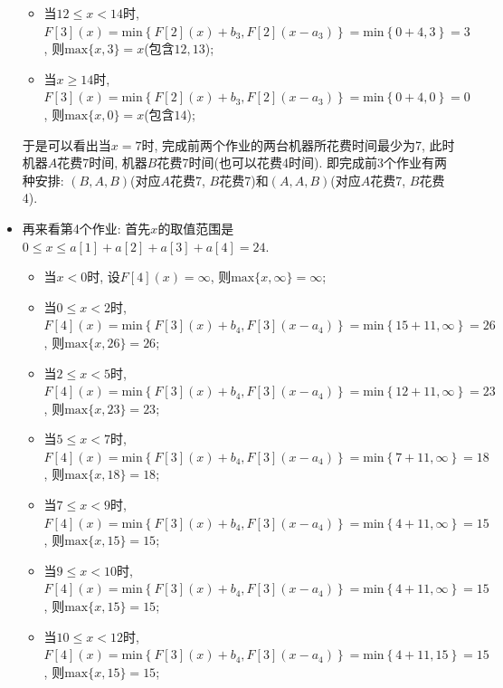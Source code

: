 \documentclass{article}
\begin{document}
\begin{homeworkProblem}
\begin{itemize}
\begin{itemize}
			\item 当$12\leq x <14$时, $F\left[ 3 \right] \left( x \right) =\text{min} \left\{ F\left[ 2 \right] \left( x \right) +b_3,F\left[ 2 \right] \left( x-a_3 \right) \right\} =\text{min} \left\{ 0+4,3 \right\} =3$, 则$\text{max}\{x,3\}=x$(包含$12,13$);
			\item 当$x\geq 14$时, $F\left[ 3 \right] \left( x \right) =\text{min} \left\{ F\left[ 2 \right] \left( x \right) +b_3,F\left[ 2 \right] \left( x-a_3 \right) \right\} =\text{min} \left\{ 0+4,0 \right\} =0$, 则$\text{max}\{x,0\}=x$(包含$14$);
		\end{itemize}
		于是可以看出当$x=7$时, 完成前两个作业的两台机器所花费时间最少为7, 此时机器$A$花费7时间, 机器$B$花费7时间(也可以花费4时间). 即完成前3个作业有两种安排: $(B,A,B)$(对应$A$花费7, $B$花费7)和$(A,A,B)$(对应$A$花费7, $B$花费4).
		\item 再来看第4个作业: 首先$x$的取值范围是$0\leq x\leq a[1]+a[2]+a[3]+a[4]=24$.
		\begin{itemize}
			\item 当$x<0$时, 设$F[4](x)=\infty$, 则$\text{max}\{x,\infty\}=\infty$;
			\item 当$0\leq x < 2$时, $F\left[ 4 \right] \left( x \right) =\text{min} \left\{ F\left[ 3 \right] \left( x \right) +b_4,F\left[ 3 \right] \left( x-a_4 \right) \right\} =\text{min} \left\{ 15+11,\infty \right\} =26$, 则$\text{max}\{x,26\}=26$;
			\item 当$2\leq x<5$时, $F\left[ 4 \right] \left( x \right) =\text{min} \left\{ F\left[ 3 \right] \left( x \right) +b_4,F\left[ 3 \right] \left( x-a_4 \right) \right\} =\text{min} \left\{ 12+11,\infty \right\} =23$, 则$\text{max}\{x,23\}=23$;
			\item 当$5\leq x<7$时, $F\left[ 4 \right] \left( x \right) =\text{min} \left\{ F\left[ 3 \right] \left( x \right) +b_4,F\left[ 3 \right] \left( x-a_4 \right) \right\} =\text{min} \left\{ 7+11,\infty \right\} =18$, 则$\text{max}\{x,18\}=18$;
			\item 当$7\leq x<9$时, $F\left[ 4 \right] \left( x \right) =\text{min} \left\{ F\left[ 3 \right] \left( x \right) +b_4,F\left[ 3 \right] \left( x-a_4 \right) \right\} =\text{min} \left\{ 4+11,\infty \right\} =15$, 则$\text{max}\{x,15\}=15$;
			\item 当$9\leq x<10$时, $F\left[ 4 \right] \left( x \right) =\text{min} \left\{ F\left[ 3 \right] \left( x \right) +b_4,F\left[ 3 \right] \left( x-a_4 \right) \right\} =\text{min} \left\{ 4+11,\infty \right\} =15$, 则$\text{max}\{x,15\}=15$;
			\item 当$10\leq x<12$时, $F\left[ 4 \right] \left( x \right) =\text{min} \left\{ F\left[ 3 \right] \left( x \right) +b_4,F\left[ 3 \right] \left( x-a_4 \right) \right\} =\text{min} \left\{ 4+11,15 \right\} =15$, 则$\text{max}\{x,15\}=15$;

\end{itemize}
\end{itemize}
\end{homeworkProblem}
\end{document}
